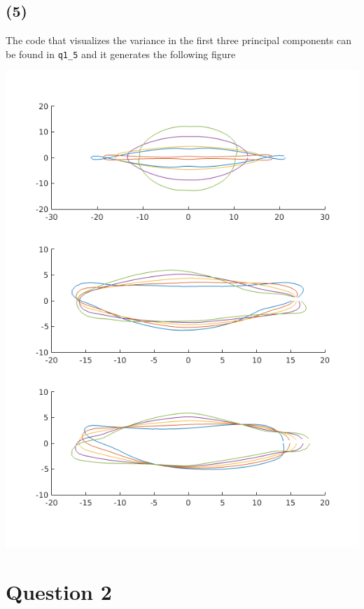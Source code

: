 \documentclass[a4paper]{article}
\begin{document}
\subsection*{(5)}
The code that visualizes the variance in the first three principal components can be found in \texttt{q1\_5} and it generates the following figure
\begin{center}
\includegraphics[scale=0.75]{fig5}
\end{center}

\newpage
\section*{Question 2}
\end{document}
